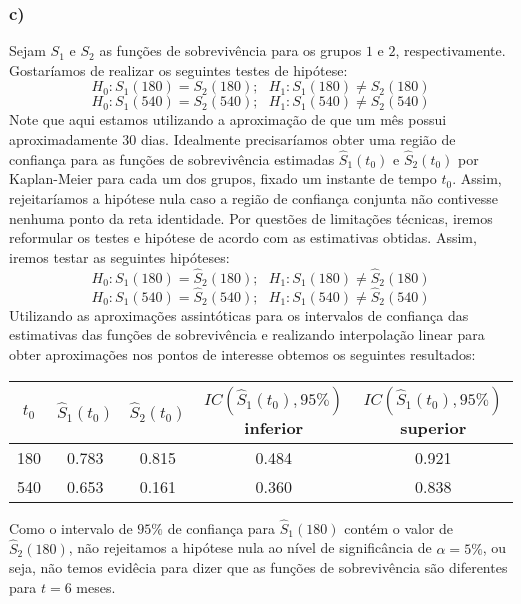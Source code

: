 \documentclass[
]{article}
\begin{document}
\hypertarget{c-1}{%
\subsubsection{c)}\label{c-1}}

Sejam \(S_{1}\) e \(S_{2}\) as funções de sobrevivência para os grupos
\(1\) e \(2\), respectivamente. Gostaríamos de realizar os seguintes
testes de hipótese:
\[ H_{0}: S_{1}(180) = S_{2}(180); \ \ \ H_{1}: S_{1}(180) \neq S_{2}(180)\]
\[ H_{0}: S_{1}(540) = S_{2}(540); \ \ \ H_{1}: S_{1}(540) \neq S_{2}(540)\]
Note que aqui estamos utilizando a aproximação de que um mês possui
aproximadamente \(30\) dias. Idealmente precisaríamos obter uma região
de confiança para as funções de sobrevivência estimadas
\(\hat{S}_{1}(t_{0})\) e \(\hat{S}_{2}(t_{0})\) por Kaplan-Meier para
cada um dos grupos, fixado um instante de tempo \(t_{0}\). Assim,
rejeitaríamos a hipótese nula caso a região de confiança conjunta não
contivesse nenhuma ponto da reta identidade. Por questões de limitações
técnicas, iremos reformular os testes e hipótese de acordo com as
estimativas obtidas. Assim, iremos testar as seguintes hipóteses:
\[ H_{0}: S_{1}(180) = \hat{S}_{2}(180); \ \ \ H_{1}: S_{1}(180) \neq \hat{S}_{2}(180) \]
\[ H_{0}: S_{1}(540) = \hat{S}_{2}(540); \ \ \ H_{1}: S_{1}(540) \neq \hat{S}_{2}(540) \]
Utilizando as aproximações assintóticas para os intervalos de confiança
das estimativas das funções de sobrevivência e realizando interpolação
linear para obter aproximações nos pontos de interesse obtemos os
seguintes resultados:

\begin{table}[H]
\centering
\begin{tabular}{ccccc}
\toprule
$t_{0}$ & $\hat{S}_{1}(t_{0})$ & $\hat{S}_{2}(t_{0})$ & $IC(\hat{S}_{1}(t_{0}), 95\%)$ inferior & $IC(\hat{S}_{1}(t_{0}), 95\%)$ superior\\
\midrule
180 & 0.783 & 0.815 & 0.484 & 0.921\\
540 & 0.653 & 0.161 & 0.360 & 0.838\\
\bottomrule
\end{tabular}
\end{table}

Como o intervalo de \(95\%\) de confiança para \(\hat{S}_{1}(180)\)
contém o valor de \(\hat{S}_{2}(180)\), não rejeitamos a hipótese nula
ao nível de significância de \(\alpha = 5\%\), ou seja, não temos
evidêcia para dizer que as funções de sobrevivência são diferentes para
\(t = 6\) meses.
\end{document}
